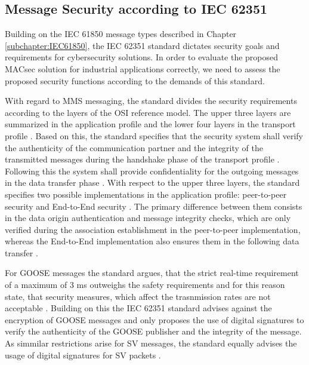 \documentclass[conference, onecolumn, a4paper]{IEEEtran}
\begin{document}
\subsection{Message Security according to IEC 62351}
\noindent Building on the IEC 61850 message types described in Chapter \ref{subchapter:IEC61850}, the IEC 62351 standard \cite{IEC62351:2024} dictates 
security goals and requirements for cybersecurity solutions. In order to evaluate the proposed MACsec solution for industrial applications correctly, 
we need to assess the proposed security functions according to the demands of this standard.

\smallskip
With regard to MMS messaging, the standard divides the security requirements according to the layers of the OSI reference model. The upper three layers 
are summarized in the application profile and the lower four layers in the transport profile \cite{SecureMMS:2020}. Based on this, the standard specifies 
that the security system shall verify the authenticity of the communication partner and the integrity of the transmitted messages during the handshake 
phase of the transport profile \cite{Review_IEC62351:2019}. Following this the system shall provide confidentiality for the outgoing messages in the 
data transfer phase \cite{SecureMMS:2020}. With respect to the upper three layers, the standard specifies two possible implementations in the application 
profile: peer-to-peer security and End-to-End security \cite{Review_IEC62351:2019}. The primary difference between them consists in the data origin 
authentication and message integrity checks, which are only verified during the association establishment in the peer-to-peer implementation, whereas 
the End-to-End implementation also ensures them in the following data transfer \cite{Review_IEC62351:2019}.

\smallskip
For GOOSE messages the standard argues, that the strict real-time requirement of a maximum of 3 ms \cite{GOOSE_confidentiality_integrity:2020} outweighs 
the safety requirements and for this reason state, that security measures, which affect the trasnmission rates are not acceptable \cite{PoisonedGOOSE:2014}. 
Building on this the IEC 62351 standard advises against the encryption of GOOSE messages and only proposes the use of digital signatures to verify the 
authenticity of the GOOSE publisher and the integrity of the message. As simmilar restrictions arise for SV messages, the standard equally advises the 
usage of digital signatures for SV packets \cite{Review_IEC62351:2019}. 
\end{document}
